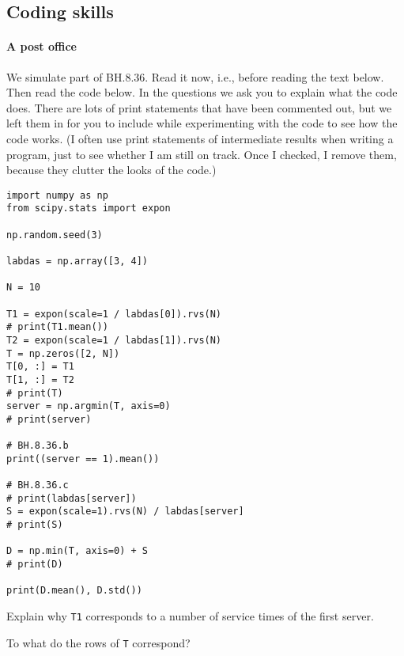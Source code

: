 \documentclass[assignments]{subfiles}
\begin{document}
\subsection{Coding skills}
\label{sec:coding-skills-1}

\paragraph{A post office}

We simulate part of BH.8.36.
Read it now, i.e., before reading the text below.
Then read the code below.
In the questions we ask you to explain what the code does.
There are lots of print statements that have been commented out, but we left them in for you to include while experimenting with the code to see how the code works.
(I often use print statements of intermediate results when writing a program, just to see whether I am still on track.
Once I checked, I remove them, because they clutter the looks of the code.)

\begin{verbatim}
import numpy as np
from scipy.stats import expon

np.random.seed(3)

labdas = np.array([3, 4])

N = 10

T1 = expon(scale=1 / labdas[0]).rvs(N)
# print(T1.mean())
T2 = expon(scale=1 / labdas[1]).rvs(N)
T = np.zeros([2, N])
T[0, :] = T1
T[1, :] = T2
# print(T)
server = np.argmin(T, axis=0)
# print(server)

# BH.8.36.b
print((server == 1).mean())

# BH.8.36.c
# print(labdas[server])
S = expon(scale=1).rvs(N) / labdas[server]
# print(S)

D = np.min(T, axis=0) + S
# print(D)

print(D.mean(), D.std())
\end{verbatim}

\begin{exercise}
Explain why  \texttt{T1} corresponds to a number of service times of the first server.
\begin{solution}
\end{solution}
\end{exercise}

\begin{exercise}
To what do the rows of \texttt{T} correspond?
\begin{solution}
\end{solution}
\end{exercise}
\end{document}
